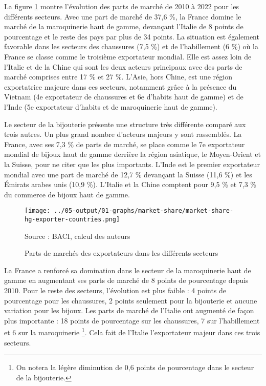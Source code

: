 \documentclass[french,10pt,a4paper]{article}
\begin{document}
La figure \ref{fig:market-share} montre l'évolution des parts de marché de 2010 à 2022 pour les différents secteurs. Avec une part de marché de 37,6 \%, la France domine le marché de la maroquinerie haut de gamme, devançant l'Italie de 8 points de pourcentage et le reste des pays par plus de 34 points. La situation est également favorable dans les secteurs des chaussures (7,5 \%) et de l'habillement (6 \%) où la France se classe comme le troisième exportateur mondial. Elle est assez loin de l'Italie et de la Chine qui sont les deux acteurs principaux avec des parts de marché comprises entre 17 \% et 27 \%. L'Asie, hors Chine, est une région exportatrice majeure dans ces secteurs, notamment grâce à la présence du Vietnam (4e exportateur de chaussures et 6e d'habits haut de gamme) et de l'Inde (5e exportateur d'habits et de maroquinerie haut de gamme). 

Le secteur de la bijouterie présente une structure très différente comparé aux trois autres. Un plus grand nombre d'acteurs majeurs y sont rassemblés. La France, avec ses 7,3 \% de parts de marché, se place comme le 7e exportateur mondial de bijoux haut de gamme derrière la région asiatique, le Moyen-Orient et la Suisse, pour ne citer que les plus importants. L'Inde est le premier exportateur mondial avec une part de marché de 12,7 \% devançant la Suisse (11,6 \%) et les Émirats arabes unis (10,9 \%). L'Italie et la Chine comptent pour 9,5 \% et 7,3 \% du commerce de bijoux haut de gamme.

\begin{figure}[!h]
  \centering
  \texttt{[image: ../05-output/01-graphs/market-share/market-share-hg-exporter-countries.png]}
  \captionsetup{justification=raggedright,singlelinecheck=false, font=small}
  \caption*{Source : BACI, calcul des auteurs}
  \captionsetup{justification=centering, singlelinecheck=true, font=normalsize}
  \caption{Parts de marchés des exportateurs dans les différents secteurs}
  \label{fig:market-share}
\end{figure}

\bigskip

La France a renforcé sa domination dans le secteur de la maroquinerie haut de gamme en augmentant ses parts de marché de 8 points de pourcentage depuis 2010. Pour le reste des secteurs, l'évolution est plus faible : 4 points de pourcentage pour les chaussures, 2 points seulement pour la bijouterie et aucune variation pour les bijoux. Les parts de marché de l'Italie ont augmenté de façon plus importante : 18 points de pourcentage sur les chaussures, 7 sur l'habillement et 6 sur la maroquinerie \footnote{On notera la légère diminution de 0,6 points de pourcentage dans le secteur de la bijouterie.}. Cela fait de l'Italie l'exportateur majeur dans ces trois secteurs.
\end{document}
